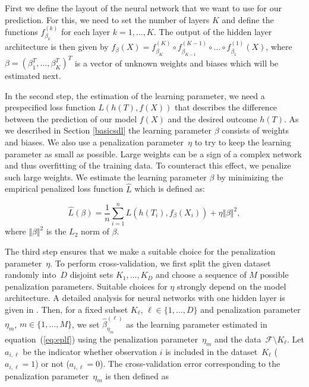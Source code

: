 \documentclass[12pt, a4paper]{scrartcl}
\theoremstyle{definition}
\theoremstyle{plain}
\numberwithin{equation}{section}
\numberwithin{figure}{section}
\numberwithin{table}{section}
\begin{document}
	First we define the layout of the neural network that we want to use for our prediction.
	For this, we need to set the number of layers $K$ and define the functions $f_{\beta_k}^{(k)}$ for each layer $k = 1, \dots, K$.
	The output of the hidden layer architecture is then given by $f_{\beta}(X) = f_{\beta_K}^{(K)} \circ f_{\beta_{K-1}}^{(K-1)} \circ \dots \circ f_{\beta_1}^{(1)}(X)$, where $\beta = (\beta_1^T, \dots, \beta_K^T)^T$ is a vector of unknown weights and biases which will be estimated next.
	
	In the second step, the estimation of the learning parameter, we need a prespecified loss function $L(h(T), f(X))$ that describes the difference between the prediction of our model $f(X)$ and the desired outcome $h(T)$.
	As we described in Section \ref{basicsdl} the learning parameter $\beta$ consists of weights and biases.
	We also use a penalization parameter~$\eta$ to try to keep the learning parameter as small as possible.
	Large weights can be a sign of a complex network and thus overfitting of the training data.
	To counteract this effect, we penalize such large weights.
	We estimate the learning parameter $\beta$ by minimizing the empirical penalized loss function $\hat{L}$ which is defined as:
	
	\begin{equation}\label{eq:eplf}
	\hat{L}(\beta) = \frac{1}{n} \sum_{i=1}^n L( h(T_i), f_{\beta}(X_i)) + \eta \Vert \beta \Vert ^2,
	\end{equation}
	where $\Vert \beta \Vert ^2$ is the $L_2$ norm of $\beta$.
	
	The third step ensures that we make a suitable choice for the penalization parameter~$\eta$.
	To perform cross-validation, we first split the given dataset randomly into~$D$ disjoint sets $K_1,\dots, K_D$ and choose a sequence of $M$ possible penalization parameters.
	Suitable choices for $\eta$ strongly depend on the model architecture.
	A detailed analysis for neural networks with one hidden layer is given in \citet*{regpar}. 
	Then, for a fixed subset $K_{\ell}$, $\ell \in \{1,\dots,D\}$ and penalization parameter $\eta_m$, $m \in \{1,\dots,M\}$, we set $\hat{\beta}_{\eta_{m}}^{(\ell)}$ as the learning parameter estimated in equation~(\ref{eq:eplf}) using the penalization parameter~$\eta_m$ and the data~$\mathcal{F} \setminus K_{\ell}$.
	Let $a_{i,\ell}$ be the indicator whether observation $i$ is included in the dataset~$K_\ell$ ($a_{i,\ell} = 1$) or not ($a_{i,\ell}=0$).
	The cross-validation error corresponding to the penalization parameter~$\eta_m$ is then defined as
	
\end{document}
